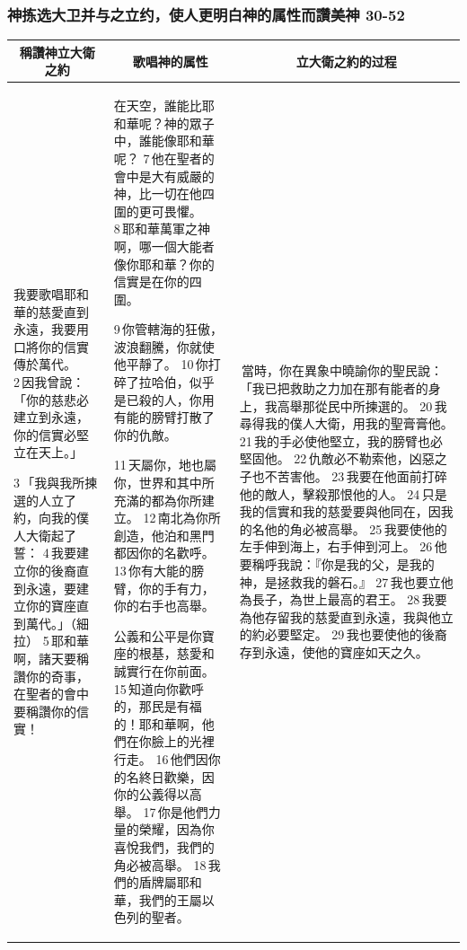 \subsubsection{神拣选大卫并与之立约，使人更明白神的属性而讚美神 30-52}
\begin{table}[H]
\centering
\begin{tabular}{p{}|p{7.75cm}|p{6.00cm}}\hline\hline
\multicolumn{1}{c|}{稱讚神立大衛之約}&\multicolumn{1}{c}{歌唱神的属性}&\multicolumn{1}{c}{立大衛之約的过程}\\\hline
我要歌唱耶和華的慈愛直到永遠，我要用口將你的信實傳於萬代。
2 因我曾說：「你的慈悲必建立到永遠，你的信實必堅立在天上。」

3 「我與我所揀選的人立了約，向我的僕人大衛起了誓：
4 我要建立你的後裔直到永遠，要建立你的寶座直到萬代。」（細拉）
5 耶和華啊，諸天要稱讚你的奇事，在聖者的會中要稱讚你的信實！
&在天空，誰能比耶和華呢？神的眾子中，誰能像耶和華呢？
7 他在聖者的會中是大有威嚴的神，比一切在他四圍的更可畏懼。
8 耶和華萬軍之神啊，哪一個大能者像你耶和華？你的信實是在你的四圍。

9 你管轄海的狂傲，波浪翻騰，你就使他平靜了。
10 你打碎了拉哈伯，似乎是已殺的人，你用有能的膀臂打散了你的仇敵。

11 天屬你，地也屬你，世界和其中所充滿的都為你所建立。
12 南北為你所創造，他泊和黑門都因你的名歡呼。
13 你有大能的膀臂，你的手有力，你的右手也高舉。

公義和公平是你寶座的根基，慈愛和誠實行在你前面。
15 知道向你歡呼的，那民是有福的！耶和華啊，他們在你臉上的光裡行走。
16 他們因你的名終日歡樂，因你的公義得以高舉。
17 你是他們力量的榮耀，因為你喜悅我們，我們的角必被高舉。
18 我們的盾牌屬耶和華，我們的王屬以色列的聖者。
& 當時，你在異象中曉諭你的聖民說：「我已把救助之力加在那有能者的身上，我高舉那從民中所揀選的。
20 我尋得我的僕人大衛，用我的聖膏膏他。
21 我的手必使他堅立，我的膀臂也必堅固他。
22 仇敵必不勒索他，凶惡之子也不苦害他。
23 我要在他面前打碎他的敵人，擊殺那恨他的人。
24 只是我的信實和我的慈愛要與他同在，因我的名他的角必被高舉。
25 我要使他的左手伸到海上，右手伸到河上。
26 他要稱呼我說：『你是我的父，是我的神，是拯救我的磐石。』
27 我也要立他為長子，為世上最高的君王。
28 我要為他存留我的慈愛直到永遠，我與他立的約必要堅定。
29 我也要使他的後裔存到永遠，使他的寶座如天之久。\\\hline
\end{tabular}
\end{table} 


